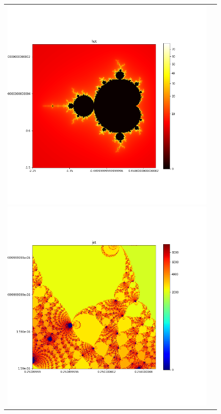 \documentclass[uplatex,a4paper,11pt,oneside,openany]{jsbook}
\begin{document}
\begin{figure}[H]
  \centering
  \begin{tabular}{cc}
    \begin{minipage}{0.5\hsize}
      \centering
      \includegraphics[clip,scale=0.3]{../src/figure/fig001.png}
    \end{minipage}
    \begin{minipage}{0.5\hsize}
      \centering
      \includegraphics[clip,scale=0.3]{../src/figure/fig002.png}

\end{minipage}
\end{tabular}
\end{figure}
\end{document}
